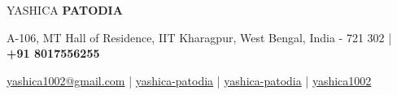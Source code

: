 \documentclass[10pt]{article}
\begin{document}
\begin{center}
    {\Huge YASHICA \textbf{PATODIA}}\\[0.7ex]
\end{center}
\vspace{-3.5ex}
\begin{center}
    {\small A-106, MT Hall of Residence, IIT Kharagpur, West Bengal, India - 721 302 | \faMobile\hspace{0.2ex} \textbf{+91 8017556255} }
\end{center}
\vspace{-3.0ex}
\begin{center}
    \Letter\hspace{0.2ex}
    \href{mailto:yashica1002@gmail.com}{\small yashica1002@gmail.com} |
    \faLinkedinSquare\hspace{0.2ex}     \href{https://www.linkedin.com/in/yashica-patodia/}{\small yashica-patodia} | 
    \faGithub\hspace{0.2ex} \href{https://github.com/yashica-patodia/}{\small yashica-patodia} |
    \faMedium\hspace{0.2ex}     
    \href{https://medium.com/@yashica1002}{\small yashica1002}
\end{center}
\end{document}

